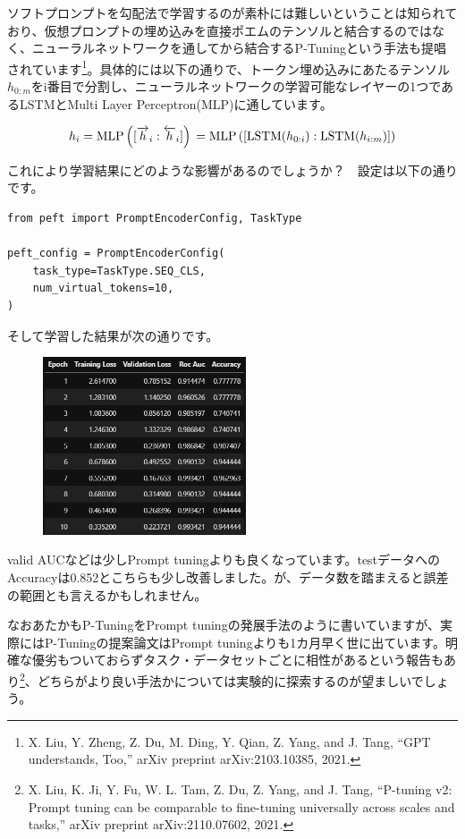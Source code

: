 \documentclass[a5paper,twoside,dvipdfmx]{jsarticle}
\begin{document}
ソフトプロンプトを勾配法で学習するのが素朴には難しいということは知られており、仮想プロンプトの埋め込みを直接ポエムのテンソルと結合するのではなく、ニューラルネットワークを通してから結合する\textsf{P-Tuning}という手法も提唱されています\footnote{X. Liu, Y. Zheng, Z. Du, M. Ding, Y. Qian, Z. Yang, and J. Tang, “GPT understands, Too,” arXiv preprint arXiv:2103.10385, 2021.}。具体的には以下の通りで、トークン埋め込みにあたるテンソル$h_{0:m}$をi番目で分割し、ニューラルネットワークの学習可能なレイヤーの1つであるLSTMとMulti Layer Perceptron(MLP)に通しています。

$$
h_i = \mathrm{MLP} \left( [\overrightarrow{h}_i : \overleftarrow{h}_i] \right) \\
= \mathrm{MLP} \left( [\mathrm{LSTM}(h_{0:i}) : \mathrm{LSTM}(h_{i:m})] \right)
$$

これにより学習結果にどのような影響があるのでしょうか？　設定は以下の通りです。

\begin{lstlisting}
from peft import PromptEncoderConfig, TaskType
  
peft_config = PromptEncoderConfig(
    task_type=TaskType.SEQ_CLS,
    num_virtual_tokens=10,
)
\end{lstlisting}

そして学習した結果が次の通りです。

\newpage

\begin{figure}[h]
  \centering
  \includegraphics[width=60mm]{../C105Fig/gray/ptuning_train.png}
 \end{figure} 

valid AUCなどは少しPrompt tuningよりも良くなっています。testデータへのAccuracyは0.852とこちらも少し改善しました。が、データ数を踏まえると誤差の範囲とも言えるかもしれません。

なおあたかもP-TuningをPrompt tuningの発展手法のように書いていますが、実際にはP-Tuningの提案論文はPrompt tuningよりも1カ月早く世に出ています。明確な優劣もついておらずタスク・データセットごとに相性があるという報告もあり\footnote{X. Liu, K. Ji, Y. Fu, W. L. Tam, Z. Du, Z. Yang, and J. Tang, “P-tuning v2: Prompt tuning can be comparable to fine-tuning universally across scales and tasks,” arXiv preprint arXiv:2110.07602, 2021.}、どちらがより良い手法かについては実験的に探索するのが望ましいでしょう。
\end{document}
